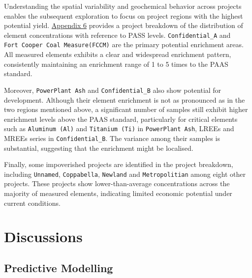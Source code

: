 \documentclass[11pt,a4paper,]{article}
\begin{document}
Understanding the spatial variability and geochemical behavior across projects enables the subsequent exploration to focus on project regions with the highest potential yield. \hyperref[sec-appendixsix]{Appendix 6} provides a project breakdown of the distribution of element concentrations with reference to PASS levels. \texttt{Confidential\_A} and \texttt{Fort\ Cooper\ Coal\ Measure(FCCM)} are the primary potential enrichment areas. All measured elements exhibits a clear and widespread enrichment pattern, consistently maintaining an enrichment range of 1 to 5 times to the PAAS standard.

Moreover, \texttt{PowerPlant\ Ash} and \texttt{Confidential\_B} also show potential for development. Although their element enrichment is not as pronounced as in the two regions mentioned above, a significant number of samples still exhibit higher enrichment levels above the PAAS standard, particularly for critical elements such as \texttt{Aluminum\ (Al)} and \texttt{Titanium\ (Ti)} in \texttt{PowerPlant\ Ash}, LREEs and MREEs series in \texttt{Confidential\_B}. The variance among their samples is substantial, suggesting that the enrichment might be localised.

Finally, some impoverished projects are identified in the project breakdown, including \texttt{Unnamed}, \texttt{Coppabella}, \texttt{Newland} and \texttt{Metropolitian} among eight other projects. These projects show lower-than-average concentrations across the majority of measured elements, indicating limited economic potential under current conditions.

\section{Discussions}\label{discussions}

\subsection{Predictive Modelling}\label{predictive-modelling-3}
\end{document}

